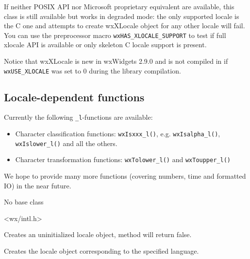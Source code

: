 If neither POSIX API nor Microsoft proprietary equivalent are available, this
class is still available but works in degraded mode: the only supported locale
is the C one and attempts to create wxXLocale object for any other locale will
fail. You can use the preprocessor macro \texttt{wxHAS\_XLOCALE\_SUPPORT} to
test if full xlocale API is available or only skeleton C locale support is
present.

Notice that wxXLocale is new in wxWidgets 2.9.0 and is not compiled in if 
\texttt{wxUSE\_XLOCALE} was set to $0$ during the library compilation.

\subsection{Locale-dependent functions}

Currently the following \texttt{\_l}-functions are available:
\begin{itemize}
    \item Character classification functions: \texttt{wxIsxxx\_l()}, e.g.
          \texttt{wxIsalpha\_l()}, \texttt{wxIslower\_l()} and all the others.
    \item Character transformation functions: \texttt{wxTolower\_l()} and
          \texttt{wxToupper\_l()}
\end{itemize}

We hope to provide many more functions (covering numbers, time and formatted
IO) in the near future.



No base class




<wx/intl.h>





\label{wxxlocalector}


Creates an uninitialized locale object,  method
will return false.


Creates the locale object corresponding to the specified language.

